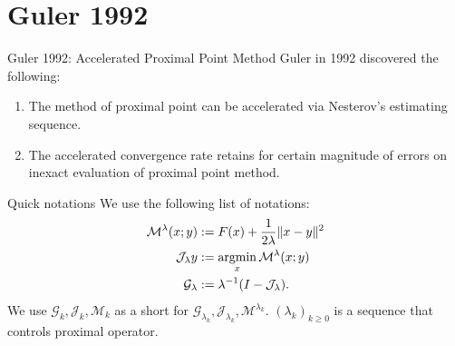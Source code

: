 \documentclass[11pt]{beamer}
\begin{document}
\section{Guler 1992}
    \begin{frame}{Guler 1992: Accelerated Proximal Point Method}
        Guler in 1992 discovered the following: 
        \begin{enumerate}
            \item The method of proximal point can be accelerated via Nesterov's estimating sequence. 
            \item The accelerated convergence rate retains for certain magnitude of errors on inexact evaluation of proximal point method. 
        \end{enumerate}
        \begin{block}{Quick notations}
            We use the following list of notations: 
            \begin{align*}
                \mathcal M^{\lambda} (x; y) &:= F(x) + \frac{1}{2\lambda}\Vert x - y\Vert^2
                \\
                \mathcal J_\lambda y &:= \mathop{\rm argmin}\limits_x \mathcal M^{\lambda} (x; y)
                \\
                \mathcal G_\lambda &:= \lambda^{-1}(I - \mathcal J_\lambda). 
            \end{align*}
            We use $\mathcal G_k, \mathcal J_k, \mathcal M_k$ as a short for $\mathcal G_{\lambda_k}, \mathcal J_{\lambda_k}, \mathcal M^{\lambda_k}$. 
            $(\lambda_k)_{k \ge0}$ is a sequence that controls proximal operator. 
        \end{block}
    \end{frame}
\end{document}
